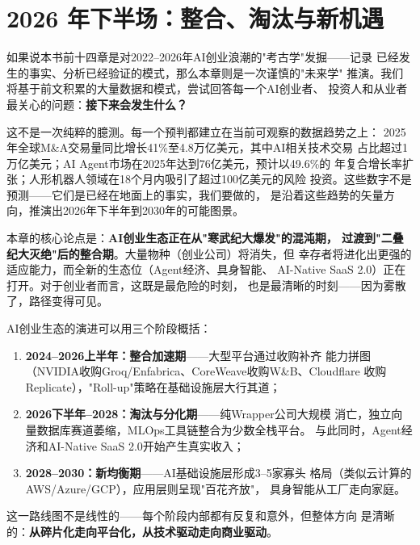 
\chapter{2026 年下半场：整合、淘汰与新机遇}
\label{ch:outlook}

如果说本书前十四章是对2022--2026年AI创业浪潮的"考古学"发掘——记录
已经发生的事实、分析已经验证的模式，那么本章则是一次谨慎的"未来学"
推演。我们将基于前文积累的大量数据和模式，尝试回答每一个AI创业者、
投资人和从业者最关心的问题：\textbf{接下来会发生什么？}

这不是一次纯粹的臆测。每一个预判都建立在当前可观察的数据趋势之上：
2025年全球M\&A交易量同比增长41\%至4.8万亿美元，其中AI相关技术交易
占比超过1万亿美元；AI Agent市场在2025年达到76亿美元，预计以49.6\%的
年复合增长率扩张；人形机器人领域在18个月内吸引了超过100亿美元的风险
投资。这些数字不是预测——它们是已经在地面上的事实，我们要做的，
是沿着这些趋势的矢量方向，推演出2026年下半年到2030年的可能图景。

本章的核心论点是：\textbf{AI创业生态正在从"寒武纪大爆发"的混沌期，
过渡到"二叠纪大灭绝"后的整合期}。大量物种（创业公司）将消失，但
幸存者将进化出更强的适应能力，而全新的生态位（Agent经济、具身智能、
AI-Native SaaS 2.0）正在打开。对于创业者而言，这既是最危险的时刻，
也是最清晰的时刻——因为雾散了，路径变得可见。

\begin{corebox}[2026--2030 AI生态演进路线图]
AI创业生态的演进可以用三个阶段概括：
\begin{enumerate}
  \item \textbf{2024--2026上半年：整合加速期}——大型平台通过收购补齐
    能力拼图（NVIDIA收购Groq/Enfabrica、CoreWeave收购W\&B、Cloudflare
    收购Replicate），"Roll-up"策略在基础设施层大行其道；
  \item \textbf{2026下半年--2028：淘汰与分化期}——纯Wrapper公司大规模
    消亡，独立向量数据库赛道萎缩，MLOps工具链整合为少数全栈平台。
    与此同时，Agent经济和AI-Native SaaS 2.0开始产生真实收入；
  \item \textbf{2028--2030：新均衡期}——AI基础设施层形成3--5家寡头
    格局（类似云计算的AWS/Azure/GCP），应用层则呈现"百花齐放"，
    具身智能从工厂走向家庭。
\end{enumerate}
这一路线图不是线性的——每个阶段内部都有反复和意外，但整体方向
是清晰的：\textbf{从碎片化走向平台化，从技术驱动走向商业驱动}。
\end{corebox}


